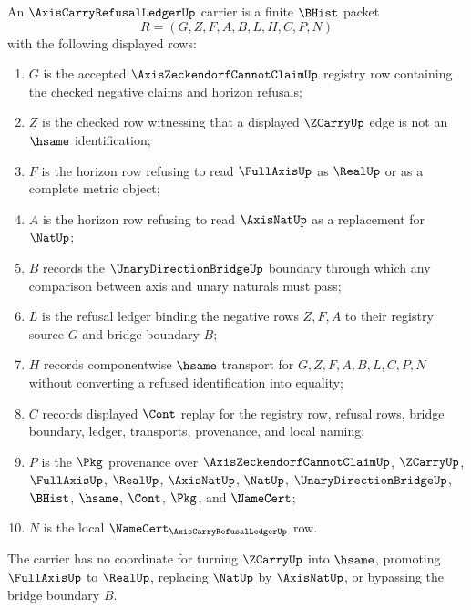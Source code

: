 \begin{definition}
\label{def:axis-carry-refusal-ledger-carrier}
An $\AxisCarryRefusalLedgerUp$ carrier is a finite $\BHist$ packet
$$
R=(G,Z,F,A,B,L,H,C,P,N)
$$
with the following displayed rows:
\begin{enumerate}
\item $G$ is the accepted $\AxisZeckendorfCannotClaimUp$ registry row containing the checked negative claims and horizon refusals;
\item $Z$ is the checked row witnessing that a displayed $\ZCarryUp$ edge is not an $\hsame$ identification;
\item $F$ is the horizon row refusing to read $\FullAxisUp$ as $\RealUp$ or as a complete metric object;
\item $A$ is the horizon row refusing to read $\AxisNatUp$ as a replacement for $\NatUp$;
\item $B$ records the $\UnaryDirectionBridgeUp$ boundary through which any comparison between axis and unary naturals must pass;
\item $L$ is the refusal ledger binding the negative rows $Z,F,A$ to their registry source $G$ and bridge boundary $B$;
\item $H$ records componentwise $\hsame$ transport for $G,Z,F,A,B,L,C,P,N$ without converting a refused identification into equality;
\item $C$ records displayed $\Cont$ replay for the registry row, refusal rows, bridge boundary, ledger, transports, provenance, and local naming;
\item $P$ is the $\Pkg$ provenance over $\AxisZeckendorfCannotClaimUp$, $\ZCarryUp$, $\FullAxisUp$, $\RealUp$, $\AxisNatUp$, $\NatUp$, $\UnaryDirectionBridgeUp$, $\BHist$, $\hsame$, $\Cont$, $\Pkg$, and $\NameCert$;
\item $N$ is the local $\NameCert_{\AxisCarryRefusalLedgerUp}$ row.
\end{enumerate}
The carrier has no coordinate for turning $\ZCarryUp$ into $\hsame$, promoting $\FullAxisUp$ to $\RealUp$, replacing $\NatUp$ by $\AxisNatUp$, or bypassing the bridge boundary $B$.
\end{definition}

